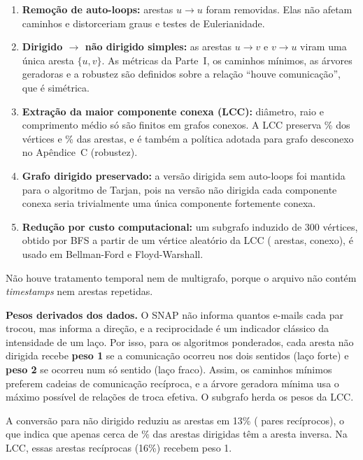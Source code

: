 \documentclass[sigconf]{webmedia}
\begin{document}
\begin{enumerate}
  \item \textbf{Remoção de auto-loops:} \nLoops{} arestas $u \rightarrow u$ foram removidas.
  Elas não afetam caminhos e distorceriam graus e testes de Eulerianidade.
  \item \textbf{Dirigido $\rightarrow$ não dirigido simples:} as arestas $u\rightarrow v$
  e $v\rightarrow u$ viram uma única aresta $\{u,v\}$. As métricas da Parte~I, os
  caminhos mínimos, as árvores geradoras e a robustez são definidos sobre a relação
  ``houve comunicação'', que é simétrica.
  \item \textbf{Extração da maior componente conexa (LCC):} diâmetro, raio e comprimento
  médio só são finitos em grafos conexos. A LCC preserva \pctVLcc\% dos vértices e \pctELcc\% das
  arestas, e é também a política adotada para grafo desconexo no Apêndice~C (robustez).
  \item \textbf{Grafo dirigido preservado:} a versão dirigida sem auto-loops foi mantida
  para o algoritmo de Tarjan, pois na versão não dirigida cada componente conexa seria
  trivialmente uma única componente fortemente conexa.
  \item \textbf{Redução por custo computacional:} um subgrafo induzido de 300 vértices,
  obtido por BFS a partir de um vértice aleatório da LCC (\nESub{} arestas, conexo), é usado
  em Bellman-Ford e Floyd-Warshall.
\end{enumerate}

Não houve tratamento temporal nem de multigrafo, porque o arquivo não contém
\emph{timestamps} nem arestas repetidas.

\textbf{Pesos derivados dos dados.} O SNAP não informa quantos e-mails cada par trocou,
mas informa a direção, e a reciprocidade é um indicador clássico da intensidade de um
laço. Por isso, para os algoritmos ponderados, cada aresta não dirigida recebe
\textbf{peso 1} se a comunicação ocorreu nos dois sentidos (laço forte) e \textbf{peso 2}
se ocorreu num só sentido (laço fraco). Assim, os caminhos mínimos preferem cadeias de
comunicação recíproca, e a árvore geradora mínima usa o máximo possível de relações de
troca efetiva. O subgrafo herda os pesos da LCC.



A conversão para não dirigido reduziu as arestas em 13\% (\nRecip{} pares recíprocos), o
que indica que apenas cerca de \pctRecip\% das arestas dirigidas têm a aresta inversa. Na
LCC, essas \nRecip{} arestas recíprocas (16\%) recebem peso 1.
\end{document}
